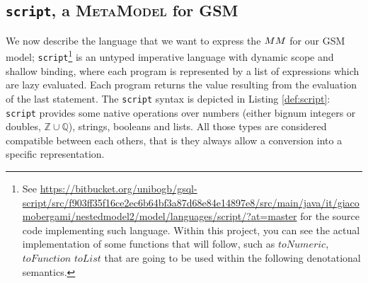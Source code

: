 \subsection{\texttt{script}, a \textsc{MetaModel} for GSM}\label{sec:scriptEll}
We now describe the language that we want to express the $\metamodel$ for our GSM model; \texttt{script}\footnote{See \url{https://bitbucket.org/unibogb/gsql-script/src/f903ff35f16ce2ec6b64bf3a87d68e84e14897e8/src/main/java/it/giacomobergami/nestedmodel2/model/languages/script/?at=master} for the source code implementing such language. Within this project, you can see the actual implementation of some functions that will follow, such as $toNumeric$, $toFunction$ $toList$ that are going to be used within the following denotational semantics.} is an untyped imperative language with dynamic scope and shallow binding, where each program is represented by a list of expressions which are lazy evaluated. Each program returns the value  resulting from the evaluation of the last statement. The \texttt{script} syntax is depicted in Listing \vref{def:script}: \texttt{script} provides some native operations over numbers (either bignum integers or doubles, $\mathbb{Z}\cup\mathbb{Q}$), strings, booleans and lists. All those types are considered compatible between each others, that is they always allow a conversion into a specific representation.



